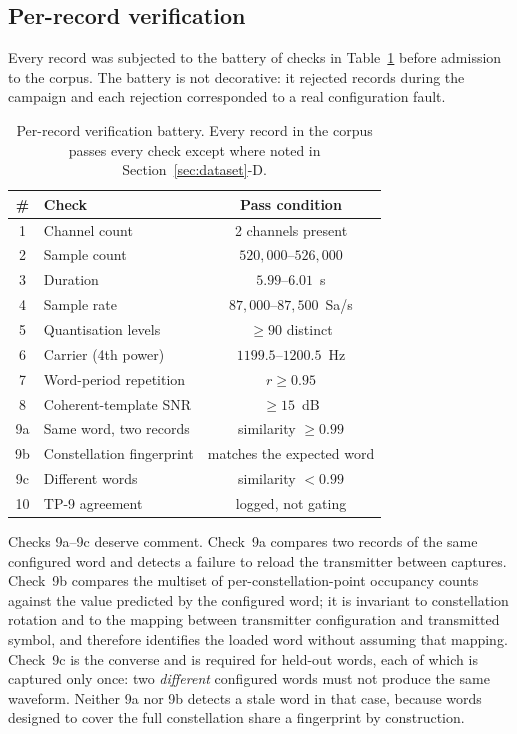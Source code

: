 \documentclass[journal]{IEEEtran}   %
\begin{document}
\subsection{Per-record verification}
Every record was subjected to the battery of checks in Table~\ref{tab:checks}
before admission to the corpus. The battery is not decorative: it rejected
records during the campaign and each rejection corresponded to a real
configuration fault.

\begin{table}[!t]
\caption{Per-record verification battery. Every record in the corpus passes
every check except where noted in Section~\ref{sec:dataset}-D.}
\label{tab:checks}
\centering
\small
\begin{tabular}{clc}
\toprule
\# & Check & Pass condition \\
\midrule
1  & Channel count            & 2 channels present \\
2  & Sample count             & $520{,}000$--$526{,}000$ \\
3  & Duration                 & $5.99$--$6.01$~s \\
4  & Sample rate              & $87{,}000$--$87{,}500$~Sa/s \\
5  & Quantisation levels      & $\geq 90$ distinct \\
6  & Carrier (4th power)      & $1199.5$--$1200.5$~Hz \\
7  & Word-period repetition   & $r \geq 0.95$ \\
8  & Coherent-template SNR    & $\geq 15$~dB \\
9a & Same word, two records   & similarity $\geq 0.99$ \\
9b & Constellation fingerprint & matches the expected word \\
9c & Different words          & similarity $< 0.99$ \\
10 & TP-9 agreement           & logged, not gating \\
\bottomrule
\end{tabular}
\end{table}

Checks 9a--9c deserve comment. Check~9a compares two records of the same
configured word and detects a failure to reload the transmitter between
captures. Check~9b compares the multiset of per-constellation-point occupancy
counts against the value predicted by the configured word; it is invariant to
constellation rotation and to the mapping between transmitter configuration and
transmitted symbol, and therefore identifies the loaded word without assuming
that mapping. Check~9c is the converse and is required for held-out words, each
of which is captured only once: two \emph{different} configured words must not
produce the same waveform. Neither 9a nor 9b detects a stale word in that case,
because words designed to cover the full constellation share a fingerprint by
construction.
\end{document}
